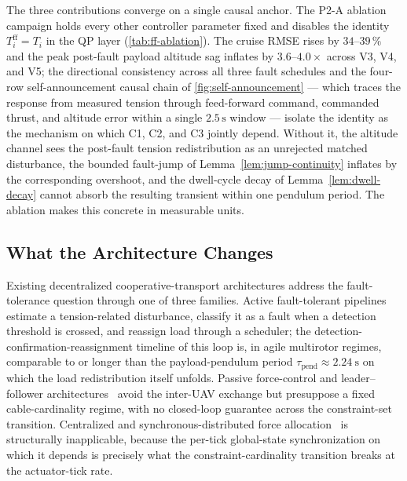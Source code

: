The three contributions converge on a single causal anchor. The P2-A ablation campaign holds every other controller parameter fixed and disables the identity $T_i^{\mathrm{ff}}=T_i$ in the QP layer (\cref{tab:ff-ablation}). The cruise RMSE rises by $34$--$39\,\%$ and the peak post-fault payload altitude sag inflates by $3.6$--$4.0\times$ across V3, V4, and V5; the directional consistency across all three fault schedules and the four-row self-announcement causal chain of \cref{fig:self-announcement} --- which traces the response from measured tension through feed-forward command, commanded thrust, and altitude error within a single $2.5\,\si{\second}$ window --- isolate the identity as the mechanism on which C1, C2, and C3 jointly depend. Without it, the altitude channel sees the post-fault tension redistribution as an unrejected matched disturbance, the bounded fault-jump of Lemma~\ref{lem:jump-continuity} inflates by the corresponding overshoot, and the dwell-cycle decay of Lemma~\ref{lem:dwell-decay} cannot absorb the resulting transient within one pendulum period. The ablation makes this concrete in measurable units.

\subsection{What the Architecture Changes}
\label{sec:discussion-advance}

Existing decentralized cooperative-transport architectures address the fault-tolerance question through one of three families. Active fault-tolerant pipelines~\cite{LiuSuspensionFailure2021} estimate a tension-related disturbance, classify it as a fault when a detection threshold is crossed, and reassign load through a scheduler; the detection-confirmation-reassignment timeline of this loop is, in agile multirotor regimes, comparable to or longer than the payload-pendulum period $\tau_{\mathrm{pend}}\approx \SI{2.24}{\second}$ on which the load redistribution itself unfolds. Passive force-control and leader--follower architectures~\cite{GassnerPassiveForce2017,NoCommTransport2021} avoid the inter-UAV exchange but presuppose a fixed cable-cardinality regime, with no closed-loop guarantee across the constraint-set transition. Centralized and synchronous-distributed force allocation~\cite{Michael2011,WangOng2017,LiLoianno2023,PallarLi2025,SuBhowmick2023} is structurally inapplicable, because the per-tick global-state synchronization on which it depends is precisely what the constraint-cardinality transition breaks at the actuator-tick rate.

